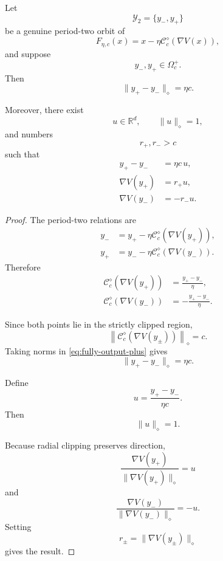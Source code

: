 \begin{proposition}
\label{prop:fully-clipped-geometry}
Let
\[
\mathcal Y_2
=
\{y_-,y_+\}
\]
be a genuine period-two orbit of
\[
F_{\eta,c}(x)
=
x-\eta
\mathcal C_c^\diamond(\nabla V(x)),
\]
and suppose
\[
y_-,y_+\in\Omega_c^+.
\]
Then
\begin{equation}
\boxed{
\|y_+-y_-\|_\diamond
=
\eta c.
}
\label{eq:fully-clipped-step-length}
\end{equation}

Moreover, there exist
\[
u\in\mathbb R^d,
\qquad
\|u\|_\diamond=1,
\]
and numbers
\[
r_+,r_->c
\]
such that
\begin{align}
y_+-y_-
&=
\eta c\,u,
\label{eq:fully-clipped-displacement}
\\
\nabla V(y_+)
&=
r_+u,
\label{eq:fully-clipped-gradient-plus}
\\
\nabla V(y_-)
&=
-r_-u.
\label{eq:fully-clipped-gradient-minus}
\end{align}
\end{proposition}

\begin{proof}
The period-two relations are
\begin{align}
y_-
&=
y_+
-
\eta
\mathcal C_c^\diamond(\nabla V(y_+)),
\label{eq:fully-cycle-plus}
\\
y_+
&=
y_-
-
\eta
\mathcal C_c^\diamond(\nabla V(y_-)).
\label{eq:fully-cycle-minus}
\end{align}
Therefore
\begin{align}
\mathcal C_c^\diamond(\nabla V(y_+))
&=
\frac{y_+-y_-}{\eta},
\label{eq:fully-output-plus}
\\
\mathcal C_c^\diamond(\nabla V(y_-))
&=
-\frac{y_+-y_-}{\eta}.
\label{eq:fully-output-minus}
\end{align}

Since both points lie in the strictly clipped region,
\[
\left\|
\mathcal C_c^\diamond(\nabla V(y_\pm))
\right\|_\diamond
=
c.
\]
Taking norms in \eqref{eq:fully-output-plus} gives
\[
\|y_+-y_-\|_\diamond
=
\eta c.
\]

Define
\[
u
=
\frac{y_+-y_-}{\eta c}.
\]
Then
\[
\|u\|_\diamond=1.
\]

Because radial clipping preserves direction,
\[
\frac{\nabla V(y_+)}
{\|\nabla V(y_+)\|_\diamond}
=
u
\]
and
\[
\frac{\nabla V(y_-)}
{\|\nabla V(y_-)\|_\diamond}
=
-u.
\]
Setting
\[
r_\pm
=
\|\nabla V(y_\pm)\|_\diamond
\]
gives the result.
\end{proof}

